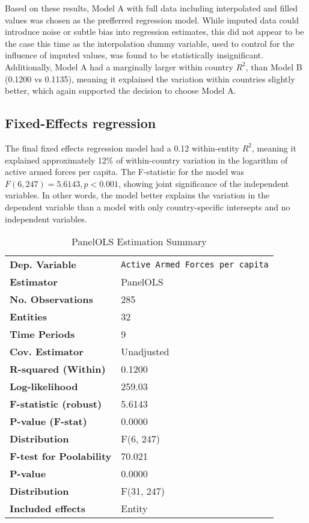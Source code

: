 Based on these results, Model A with full data including interpolated and filled values was chosen 
as the prefferred regression model. While imputed data could introduce noise or subtle bias
into regression estimates, this did not appear to be the case this time as the interpolation dummy 
variable, used to control for the influence of imputed values, was found to be statistically 
insignificant. Additionally, Model A had a marginally larger within country 
$R^2$, than Model B (0.1200 vs 0.1135), meaning it explained the variation within countries 
slightly better, which again supported the decision to choose Model A.

\subsection{Fixed-Effects regression}

\renewcommand{\arraystretch}{1.3}

The final fixed effects regression model had a 0.12 within-entity $R^2$, meaning it explained 
approximately 12\% of within-country variation in the logarithm of active armed forces per capita.
The F-statistic for the model was $F(6, 247)=5.6143, p<0.001$, showing joint significance of the independent variables.
In other words, the model better explains the variation in the dependent variable than a model with 
only country-specific intersepts and no independent variables. 

\begin{table}[htbp]
\centering
\begin{threeparttable}
\caption{PanelOLS Estimation Summary}
\label{tab:panelols_summary}
\begin{tabularx}{\textwidth}{@{}lX@{}}
\toprule
\textbf{Dep. Variable} & \texttt{Active Armed Forces per capita} \\
\textbf{Estimator} & PanelOLS \\
\textbf{No. Observations} & 285 \\
\textbf{Entities} & 32 \\
\textbf{Time Periods} & 9 \\
\textbf{Cov. Estimator} & Unadjusted \\
\midrule
\textbf{R-squared (Within)} & 0.1200 \\
\textbf{Log-likelihood} & 259.03 \\
\textbf{F-statistic (robust)} & 5.6143 \\
\textbf{P-value (F-stat)} & 0.0000 \\
\textbf{Distribution} & F(6, 247) \\
\midrule
\textbf{F-test for Poolability} & 70.021 \\
\textbf{P-value} & 0.0000 \\
\textbf{Distribution} & F(31, 247) \\
\textbf{Included effects} & Entity \\
\bottomrule
\end{tabularx}
\end{threeparttable}
\label{tab:model_summary}
\end{table}

